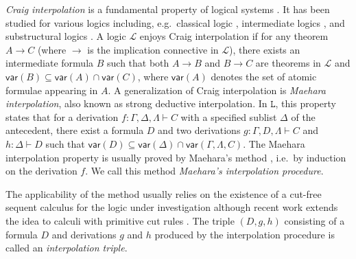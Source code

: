 \documentclass[a4paper,UKenglish,cleveref,autoref,thm-restate, anonymous]{lipics-v2021}
\newcommand{\mc}[1]{\mathcal{#1}}
\newcommand{\mf}[1]{\mathsf{#1}}
\newcommand{\vars}[1]{\mf{var} (#1)}
\newcommand{\GG}{\Gamma}
\newcommand{\GD}{\Delta}
\newcommand{\GL}{\Lambda}
\newcommand{\MIP}{\textsf{MIP}}
\renewcommand{\L}{$\mathtt{L}$}
\newcommand{\vd}{\vdash}
\begin{document}
\emph{Craig interpolation} is a fundamental property of logical systems \cite{craig:interpolation:1957}.
It has been studied for various logics including, e.g.\ classical logic \cite{craig:interpolation:1957}, intermediate logics \cite{Maksimova1977}, and substructural logics \cite{Galatos2007}.
A logic $\mc{L}$ enjoys Craig interpolation if for any theorem $A \to C$ (where $\to$ is the implication connective in $\mc{L}$), there exists an intermediate formula $B$ such that both $A \to B$ and $B \to C$ are theorems in $\mc{L}$ and $\vars{B}\subseteq \vars{A} \cap \vars{C}$, where $\vars{A}$ denotes the set of atomic formulae appearing in $A$.
A generalization of Craig interpolation is \emph{Maehara interpolation}, also known as strong deductive interpolation. In \L, this property states that for a derivation $f : \GG , \GD , \GL \vd C$ with a specified sublist $\GD$ of the antecedent, there exist a formula $D$ and two derivations $g : \GG, D, \GL \vdash C$ and $h : \GD \vdash D$ such that $\vars{D} \subseteq \vars{\GD} \cap \vars{\GG, \GL, C}$.
The Maehara interpolation property is usually proved by Maehara's method \cite{maehara1961}, i.e.\ by induction on the derivation $f$. We call this method \emph{Maehara's interpolation procedure}.

The applicability of the method usually relies on the existence of a cut-free sequent calculus for the logic under investigation although recent work extends the idea to calculi with primitive cut rules \cite{KOWALSKI2016,Hetzl2024,Saurin2025,Corbard2025}.
The triple $(D,g,h)$ consisting of a formula $D$ and derivations $g$ and $h$ produced by the interpolation procedure is called an \emph{interpolation triple}.


 
\end{document}
